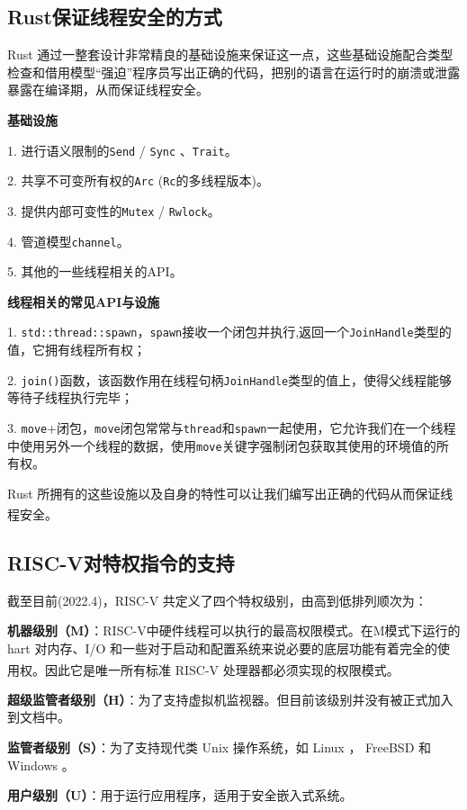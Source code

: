 \documentclass[UTF8,fontset=none,linespread=1.15]{ctexart}
\let\nosupcite\cite
\renewcommand*{\cite}[1]{\textsuperscript{\nosupcite{#1}}}
\begin{document}
\subsection{Rust保证线程安全的方式}
Rust 通过一整套设计非常精良的基础设施来保证这一点，这些基础设施配合类型检查和借用模型“强迫”程序员写出正确的代码，把别的语言在运行时的崩溃或泄露暴露在编译期，从而保证线程安全。

\textbf{基础设施}

1. 进行语义限制的\texttt{Send} / \texttt{Sync} 、\texttt{Trait}。

2. 共享不可变所有权的\texttt{Arc} (\texttt{Rc}的多线程版本)。

3. 提供内部可变性的\texttt{Mutex} / \texttt{Rwlock}。

4. 管道模型\texttt{channel}。

5. 其他的一些线程相关的API。

\textbf{线程相关的常见API与设施}

1. \texttt{std::thread::spawn}，\texttt{spawn}接收一个闭包并执行,返回一个\texttt{JoinHandle}类型的值，它拥有线程所有权；

2. \texttt{join()}函数，该函数作用在线程句柄\texttt{JoinHandle}类型的值上，使得父线程能够等待子线程执行完毕；

3. \texttt{move}+闭包，\texttt{move}闭包常常与\texttt{thread}和\texttt{spawn}一起使用，它允许我们在一个线程中使用另外一个线程的数据，使用\texttt{move}关键字强制闭包获取其使用的环境值的所有权。

Rust 所拥有的这些设施以及自身的特性可以让我们编写出正确的代码从而保证线程安全。\cite{9}

\subsection{RISC-V对特权指令的支持}
截至目前(2022.4)，RISC-V 共定义了四个特权级别，由高到低排列顺次为：

\textbf{机器级别（M）}：RISC-V中硬件线程可以执行的最高权限模式。在M模式下运行的 hart 对内存、I/O 和一些对于启动和配置系统来说必要的底层功能有着完全的使用权。因此它是唯一所有标准 RISC-V 处理器都必须实现的权限模式。\cite{a}

\textbf{超级监管者级别（H）}：为了支持虚拟机监视器。但目前该级别并没有被正式加入到文档中。

\textbf{监管者级别（S）}：为了支持现代类 Unix 操作系统，如 Linux ， FreeBSD 和 Windows 。

\textbf{用户级别（U）}：用于运行应用程序，适用于安全嵌入式系统。
\end{document}
